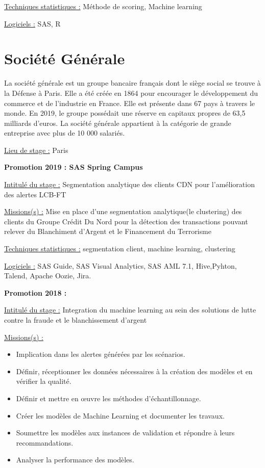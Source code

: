 \documentclass[
  letterpaper,
  DIV=11,
  numbers=noendperiod]{scrreprt}
\begin{document}
\uline{Techniques statistiques :} Méthode de scoring, Machine learning

\uline{Logiciels :} SAS, R

\hypertarget{sociuxe9tuxe9-guxe9nuxe9rale}{%
\section{\texorpdfstring{\textbf{Société
Générale}}{Société Générale}}\label{sociuxe9tuxe9-guxe9nuxe9rale}}

La société générale est un groupe bancaire français dont le siège social
se trouve à la Défense à Paris. Elle a été créée en 1864 pour encourager
le développement du commerce et de l'industrie en France. Elle est
présente dans 67 pays à travers le monde. En 2019, le groupe possédait
une réserve en capitaux propres de 63,5 milliards d'euros. La société
générale appartient à la catégorie de grande entreprise avec plus de 10
000 salariés.

\uline{Lieu de stage :} Paris

\textbf{Promotion 2019 : SAS Spring Campus}

\uline{Intitulé du stage :} Segmentation analytique des clients CDN pour
l'amélioration des alertes LCB-FT

\uline{Missions(s) :} Mise en place d'une segmentation analytique(le
clustering) des clients du Groupe Crédit Du Nord pour la détection des
transactions pouvant relever du Blanchiment d'Argent et le Financement
du Terrorisme

\uline{Techniques statistiques :} segmentation client, machine learning,
clustering

\uline{Logiciels :} SAS Guide, SAS Visual Analytics, SAS AML 7.1,
Hive,Pyhton, Talend, Apache Oozie, Jira.

\textbf{Promotion 2018 :}

\uline{Intitulé du stage :} Integration du machine learning au sein des
solutions de lutte contre la fraude et le blanchissement d'argent

\uline{Missions(s) :}

\begin{itemize}
\item
  Implication dans les alertes générées par les scénarios.
\item
  Définir, réceptionner les données nécessaires à la création des
  modèles et en vérifier la qualité.
\item
  Définir et mettre en œuvre les méthodes d'échantillonnage.
\item
  Créer les modèles de Machine Learning et documenter les travaux.
\item
  Soumettre les modèles aux instances de validation et répondre à leurs
  recommandations.
\item
  Analyser la performance des modèles.
\end{itemize}
\end{document}
